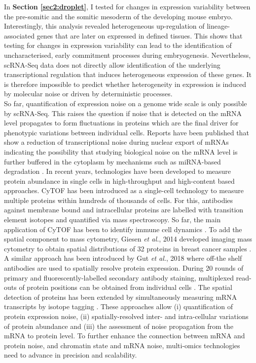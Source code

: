 In \textbf{Section \ref{sec2:droplet}}, I tested for changes in expression variability between the pre-somitic and the somitic mesoderm of the developing mouse embryo. 
Interestingly, this analysis revealed heterogeneous up-regulation of lineage-associated genes that are later on expressed in defined tissues. 
This shows that testing for changes in expression variability can lead to the identification of uncharacterised, early commitment processes during embryogenesis. 
Nevertheless, scRNA-Seq data does not directly allow identification of the underlying transcriptional regulation that induces heterogeneous expression of these genes. 
It is therefore impossible to predict whether heterogeneity in expression is induced by molecular noise or driven by deterministic processes.\\

So far, quantification of expression noise on a genome wide scale is only possible by scRNA-Seq. 
This raises the question if noise that is detected on the mRNA level propagates to form fluctuations in proteins which are the final driver for phenotypic variations between individual cells. 
Reports have been published that show a reduction of transcriptional noise during nuclear export of mRNAs \citep{Battich2015a, BaharHalpern2015a} indicating the possibility that studying biological noise on the mRNA level is further buffered in the cytoplasm by mechanisms such as miRNA-based degradation \citep{Schmiedel2015}. 
In recent years, technologies have been developed to measure protein abundance in single cells in high-throughput and high-content based approaches. 
\Gls{CyTOF} has been introduced as a single-cell technology to measure multiple proteins within hundreds of thousands of cells. 
For this, antibodies against membrane bound and intracellular proteins are labelled with transition element isotopes and quantified via mass spectroscopy. 
So far, the main application of CyTOF has been to identify immune cell dynamics \citep{Bendall2011}. 
To add the spatial component to mass cytometry, Giesen \emph{et al.}, 2014 developed imaging mass cytometry to obtain spatial distributions of 32 proteins in breast cancer samples \citep{Giesen2014}. 
A similar approach has been introduced by Gut \emph{et al.}, 2018 where off-the shelf antibodies are used to spatially resolve protein expression. 
During 20 rounds of primary and fluorescently-labelled secondary antibody staining, multiplexed read-outs of protein positions can be obtained from individual cells \citep{Gut2018}. 
The spatial detection of proteins has been extended by simultaneously measuring mRNA transcripts by isotope tagging \cite{Schulz2018}. 
These approaches allow (i) quantification of protein expression noise, (ii) spatially-resolved inter- and intra-cellular variations of protein abundance and (iii) the assessment of noise propagation from the mRNA to protein level. 
To further enhance the connection between mRNA and protein noise, and chromatin state and mRNA noise, multi-omics technologies need to advance in precision and scalability.

